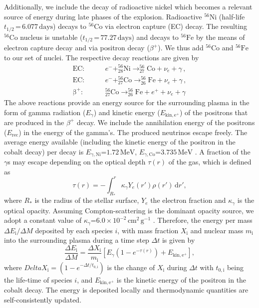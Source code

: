 \documentclass[fleqn,usenatbib]{mnras}
\newcommand{\ud}{\ensuremath{\mathrm{d}}\xspace}
\newcommand{\nickel}{\ensuremath{\mathrm{^{56}Ni}}\xspace}
\newcommand{\iron}{\ensuremath{\mathrm{^{56}Fe}}\xspace}
\newcommand{\cobalt}{\ensuremath{\mathrm{^{56}Co}}\xspace}
\begin{document}
Additionally, we include the decay of radioactive nickel which 
becomes a relevant source of energy during late phases of the explosion.
Radioactive \nickel 
(half-life $t_{1/2}\,\mathord{=}\,  6.077\, \mathrm{days}$) 
decays to \cobalt via electron capture (EC) decay. The resulting 
\cobalt nucleus is unstable ($t_{1/2}\,\mathord{=}\, 77.27\, \mathrm{days}$) 
and decays to \iron by the means of electron capture decay 
and via positron decay ($\beta^+$). We thus add \cobalt 
and \iron to our set of nuclei.
The respective decay reactions are given by
\begin{align*}
   \mathrm{EC:}&\qquad e^- + _{28}^{56}\mathrm{Ni} \rightarrow _{27}^{56}\mathrm{Co} + \nu_e + \gamma\, , \\
   \mathrm{EC:}&\qquad e^- + _{27}^{56}\mathrm{Co} \rightarrow _{26}^{56}\mathrm{Fe} + \nu_e + \gamma \, , \\
   \mathrm{\beta^+ :}&\qquad _{27}^{56}\mathrm{Co} \rightarrow _{26}^{56}\mathrm{Fe} + e^+ + \nu_e + \gamma
\end{align*}
The above reactions provide an energy source for the 
surrounding plasma in the form of gamma radiation ($E_{\gamma}$) 
and kinetic energy ($E_{\mathrm{kin,e^{+}}}$) of the positrons 
that are produced in the $\beta^+$ decay. We include the 
annihilation energy of the positrons ($E_{\mathrm{rec}}$) in 
the energy of the gamma's. The produced neutrinos escape freely.
The average energy available (including the kinetic energy 
of the positron in the cobalt decay) per decay is 
$E_{\gamma,\mathrm{Ni}}\mathord{=}1.72\,\mathrm{MeV}$, 
$E_{\gamma,\mathrm{Co}}\mathord{=}3.735\,\mathrm{MeV}$ \citep{Nadyozhin1994}.
A fraction of the $\gamma$s may escape depending on 
the optical depth $\tau(r)$ of the gas, which is defined as
\begin{equation}
    \tau(r) = -\int_{R_*}^{r} \kappa_{\gamma} Y_e(r') \rho(r')\, \ud r',
\end{equation}
where $R_*$ is the radius of the stellar surface, $Y_e$ 
the electron fraction and $\kappa_{\gamma}$ is the optical opacity. 
Assuming Compton-scattering is the dominant opacity source, we 
adopt a constant value of 
$\kappa_{\gamma}\mathord{=}6.0\,\mathord{\times}\, 10^{-2} \,\mathrm{cm^2\, g^{-1}}$ \citep{Swartz1995}.
Therefore, the energy per mass $\Delta E_{\mathrm{i}}/\Delta M$
deposited by each species $i$, with mass fraction 
$X_{\mathrm{i}}$ and 
nuclear mass $m_{\mathrm{i}}$ into the surrounding plasma during a 
time step $\Delta t$ is given by
\begin{equation}
        \frac{\Delta E_{\mathrm{i}}}{\Delta M} =  \frac{\Delta X_{\mathrm{i}}}{m_{\mathrm{i}}}
        \left[ E_{\gamma} \left( 1 - e^{-\tau(r)} \right) + E_{\mathrm{kin,e^{+}}}\right],
\end{equation}
where $Delta X_{\mathrm{i}}=\left( 1 - e^{-\Delta t / t_{0,\mathrm{i}}} \right)$ is the change of $X_{\mathrm{i}}$ during $\Delta t$ with $t_{0,\mathrm{i}}$ being the life-time of species $i$, and $E_{\mathrm{kin,e^{+}}}$ is the kinetic energy of the positron in 
the cobalt decay. The energy is deposited locally and thermodynamic 
quantities are self-consistently updated.
\end{document}
